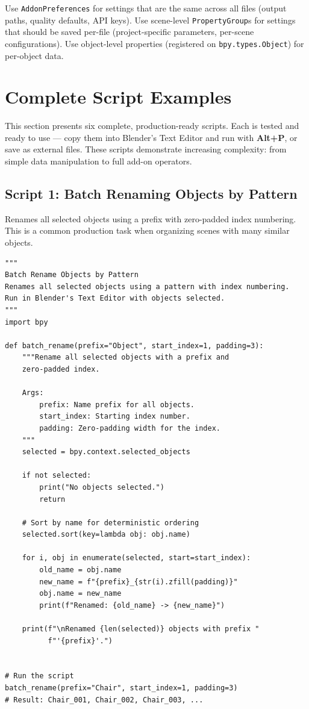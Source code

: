 \begin{tipbox}
Use \texttt{AddonPreferences} for settings that are the same across all files (output paths, quality defaults, API keys). Use scene-level \texttt{PropertyGroup}s for settings that should be saved per-file (project-specific parameters, per-scene configurations). Use object-level properties (registered on \texttt{bpy.types.Object}) for per-object data.
\end{tipbox}


\section{Complete Script Examples}
\label{sec:scripting-examples}

This section presents six complete, production-ready scripts. Each is tested and ready to use --- copy them into Blender's Text Editor and run with \textbf{Alt+P}, or save as external files. These scripts demonstrate increasing complexity: from simple data manipulation to full add-on operators.

\subsection{Script 1: Batch Renaming Objects by Pattern}

Renames all selected objects using a prefix with zero-padded index numbering. This is a common production task when organizing scenes with many similar objects.

\begin{lstlisting}
"""
Batch Rename Objects by Pattern
Renames all selected objects using a pattern with index numbering.
Run in Blender's Text Editor with objects selected.
"""
import bpy

def batch_rename(prefix="Object", start_index=1, padding=3):
    """Rename all selected objects with a prefix and
    zero-padded index.

    Args:
        prefix: Name prefix for all objects.
        start_index: Starting index number.
        padding: Zero-padding width for the index.
    """
    selected = bpy.context.selected_objects

    if not selected:
        print("No objects selected.")
        return

    # Sort by name for deterministic ordering
    selected.sort(key=lambda obj: obj.name)

    for i, obj in enumerate(selected, start=start_index):
        old_name = obj.name
        new_name = f"{prefix}_{str(i).zfill(padding)}"
        obj.name = new_name
        print(f"Renamed: {old_name} -> {new_name}")

    print(f"\nRenamed {len(selected)} objects with prefix "
          f"'{prefix}'.")


# Run the script
batch_rename(prefix="Chair", start_index=1, padding=3)
# Result: Chair_001, Chair_002, Chair_003, ...
\end{lstlisting}

